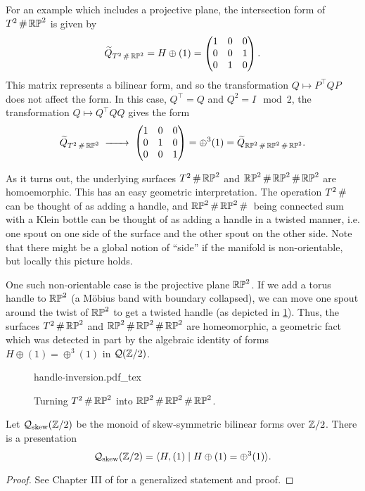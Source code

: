 \begin{example}
	For an example which includes a projective plane, the intersection form of $T^2\+ \RP^2$ is given by
	\[
		\widetilde{Q}_{T^2\+ \RP^2} = H\oplus (1)=
		\begin{pmatrix}
			1 & 0 & 0 \\
			0 & 0 & 1 \\
			0 & 1 & 0
		\end{pmatrix}.
	\]
	This matrix represents a bilinear form, and so the transformation $Q\mapsto P^\intercal Q P$ does not affect the form. In this case, $Q^\intercal =Q$ and $Q^2=I\mod 2$, the transformation $Q\mapsto Q^\intercal Q Q$ gives the form
	\[
		\widetilde{Q}_{T^2\+ \RP^2}
		\lkxto \begin{pmatrix}
			1 & 0 & 0 \\
			0 & 1 & 0 \\
			0 & 0 & 1
		\end{pmatrix} =\oplus^3(1)= \widetilde{Q}_{\RP^2\+\RP^2\+\RP^2}.
	\]
\end{example}
As it turns out, the underlying surfaces $T^2\+\RP^2$ and $\RP^2\+\RP^2\+\RP^2$ are homoemorphic. This has an easy geometric interpretation. The operation $T^2\+$ can be thought of as adding a handle, and $\RP^2\+\RP^2\+$ being connected sum with a Klein bottle can be thought of as adding a handle in a twisted manner, i.e. one spout on one side of the surface and the other spout on the other side. Note that there might be a global notion of ``side'' if the manifold is non-orientable, but locally this picture holds.

One such non-orientable case is the projective plane $\mathbb{RP}^2$. If we add a torus handle to $\mathbb{RP}^2$ (a M\"obius band with boundary collapsed), we can move one spout around the twist of $\mathbb{RP}^2$ to get a twisted handle (as depicted in \cref{fig:twisted-handle-to-handle}). Thus, the surfaces $T^2\+\RP^2$ and $\RP^2\+\RP^2\+\RP^2$ are homeomorphic, a geometric fact which was detected in part by the algebraic identity of forms $H\oplus (1)=\oplus^3(1)$ in $\mathcal{Q}(\mathbb{Z}/2)$.

\begin{figure}[ht]
	\centering
	{handle-inversion.pdf_tex}
	\caption{Turning $T^2\+\RP^2$ into $\RP^2\+\RP^2\+\RP^2$.}\label{fig:twisted-handle-to-handle}
\end{figure}

\begin{proposition}
	Let $\mathcal{Q}_{\mathrm{skew}}(\mathbb{Z}/2)$ be the monoid of skew-symmetric bilinear forms over $\mathbb{Z}/2$. There is a presentation
	\[\mathcal{Q}_{\mathrm{skew}}(\mathbb{Z}/2) = \langle H, (1) \mid H\oplus (1) = \oplus^3 (1)\rangle.\]
\end{proposition}
\begin{proof}
	See Chapter III of \cite{milnorhuse1973forms} for a generalized statement and proof.
\end{proof}

